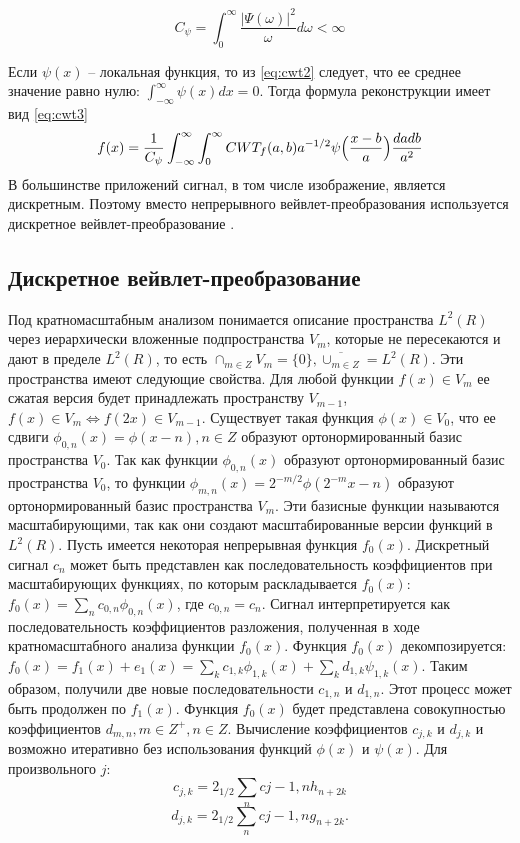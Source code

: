 \begin{equation}\label{eq:cwt2}
C_{\psi} = \int_{0}^{\infty}\frac{|\Psi(\omega)|^2}{\omega}d\omega < \infty
\end{equation}

Если $\psi(x)$ – локальная функция, то из \ref{eq:cwt2} следует, что ее среднее значение равно нулю: $\int_{-\infty}^{\infty}\psi(x)dx=0$.
Тогда формула реконструкции имеет вид \ref{eq:cwt3}
\begin{equation}\label{eq:cwt3}
f(x) = \frac{1}{C_{\psi}} \int_{-\infty}^{\infty} \int_{0}^{\infty} CWT_{f}(a, b)a^{-1/2}\psi\Bigl(\frac{x-b}{a}\Bigr)\frac{dadb}{a^2}
\end{equation}
В большинстве приложений сигнал, в том числе изображение, является дискретным. 
Поэтому вместо непрерывного вейвлет-преобразования используется дискретное вейвлет-преобразование \cite{Pup04}.

\subsection{Дискретное вейвлет-преобразование}
Под кратномасштабным анализом понимается описание пространства $L^2(R)$ через иерархически вложенные 
подпространства $V_{m}$, которые не пересекаются и дают в пределе $L^2(R)$, то есть $\cap_{m \in Z}V_{m}=\{0\}, \overline{\cup_{m \in Z}} = L^{2}(R)$.
Эти пространства имеют следующие свойства. Для любой функции $f(x) \in V_{m}$ ее сжатая версия будет принадлежать пространству $V_{m-1}$,
$f(x) \in V_{m} \Leftrightarrow f(2x) \in V_{m-1}$.
Существует такая функция $\phi(x) \in V_{0}$, что ее сдвиги $\phi_{0,n}(x) = \phi(x-n), n \in Z$ образуют ортонормированный базис пространства $V_{0}$. 
Так как функции $\phi_{0,n}(x)$ образуют ортонормированный базис пространства $V_{0}$, то функции $\phi_{m,n}(x) = 2^{-m/2} \phi(2^{-m}x-n)$
образуют ортонормированный базис пространства $V_{m}$. Эти базисные функции называются масштабирующими, 
так как они создают масштабированные версии функций в $L^{2}(R)$.
Пусть имеется некоторая непрерывная функция $f_{0}(x)$. Дискретный сигнал $c_{n}$ может быть представлен 
как последовательность коэффициентов при масштабирующих функциях, по которым раскладывается $f_{0}(x)$: $f_{0}(x)=\sum_{n}c_{0,n}\phi_{0,n}(x)$,
где $c_{0,n}=c_{n}$. Сигнал интерпретируется как последовательность коэффициентов разложения, 
полученная в ходе кратномасштабного анализа функции $f_{0}(x)$. Функция $f_{0}(x)$ декомпозируется: 
$f_{0}(x)=f_{1}(x)+e_{1}(x)=\sum_{k}c_{1,k}\phi_{1,k}(x)+\sum_{k}d_{1,k}\psi_{1,k}(x)$.
Таким образом, получили две новые последовательности $c_{1,n}$ и $d_{1,n}$. Этот процесс может быть продолжен по $f_{1}(x)$. 
Функция $f_{0}(x)$ будет представлена совокупностью коэффициентов $d_{m,n}, m \in Z^{+}, n \in Z$.
Вычисление коэффициентов $c_{j,k}$ и $d_{j,k}$ и возможно итеративно без использования функций $\phi(x)$ и $\psi(x)$. 
Для произвольного $j$:
\begin{equation}\label{eq:cwt11}
c_{j,k}=2_{1/2}\sum_{n}c{j-1,n}h_{n+2k}
\end{equation}
\begin{equation}\label{eq:cwt12}
d_{j,k}=2_{1/2}\sum_{n}c{j-1,n}g_{n+2k}.
\end{equation}

